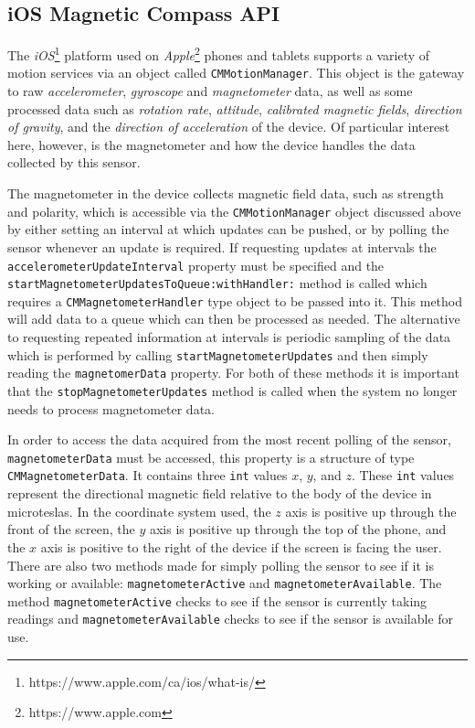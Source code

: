 \documentclass[paper=letter, fontsize=11pt]{scrartcl}
\numberwithin{equation}{section}
\numberwithin{figure}{section}
\numberwithin{table}{section}
\begin{document}
\subsection{iOS Magnetic Compass API}
\label{sec:ios_compass_api}
\par
The {\em iOS}\footnote{https://www.apple.com/ca/ios/what-is/} platform used on
{\em Apple}\footnote{https://www.apple.com} phones and tablets supports a
variety of motion services via an object called \texttt{CMMotionManager}. This
object is the gateway to raw {\em accelerometer}, {\em gyroscope} and
{\em magnetometer} data, as well as some processed data such as {\em rotation
rate}, {\em attitude}, {\em calibrated magnetic fields},
{\em direction of gravity}, and the {\em direction of acceleration} of the
device.
Of particular interest here, however, is the magnetometer and how the device
handles the data collected by this sensor.
\newline

\par
The magnetometer in the device collects magnetic field data, such as strength
and polarity, which is accessible via the \texttt{CMMotionManager} object
discussed above by either setting an interval at which updates can be pushed,
or by polling the sensor whenever an update is required. If requesting updates
at intervals the \texttt{accelero\-me\-ter\-Up\-date\-Inter\-val} property must
be specified and the \texttt{startMagnetometerUpdatesToQueue:withHandler:} method is called
which requires a \texttt{CMMagnetometerHandler} type object to be passed into
it.
This method will add data to a queue which can then be processed as needed.
The alternative to requesting repeated information at intervals is periodic
sampling of the data which is performed by calling
\texttt{startMagnetometerUpdates} and then simply reading
the \texttt{magnetomerData} property. For both of these methods it
is important that the \texttt{stopMagnetometerUpdates} method is called when
the system no longer needs to process magnetometer data. 
\newline

\par
In order to access the data acquired from the most recent polling of the
sensor, \texttt{mag\-neto\-me\-ter\-Da\-ta} must be accessed, this property is a
structure of type \texttt{CMMagnetometerData}. It contains three \texttt{int} values $x$, $y$, and
$z$. These \texttt{int} values represent the directional magnetic field relative
to the body of the device in microteslas. In the
coordinate system used, the $z$ axis is positive up through the front of the
screen, the $y$ axis is positive up through the top of the phone, and the $x$
axis is positive to the right of the device if the screen is facing the user.
There are also two methods made for simply polling the sensor to see if it is
working or available: \texttt{magnetometerActive} and
\texttt{magnetometerAvailable}. The method \texttt{magnetometerActive} checks
to see if the sensor is currently taking readings and
\texttt{magnetometerAvailable} checks to see if the sensor is available for
use.
\newline
\end{document}
